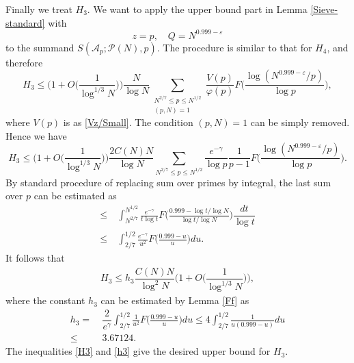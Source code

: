 \documentclass[12pt, a4paper]{amsart}
\def\le{\leqslant}
\theoremstyle{plain}
\theoremstyle{remark}
\numberwithin{equation}{section}
\begin{document}
Finally we treat $H_3$. We want to apply the upper bound part
in Lemma \ref{Sieve-standard} with
\[
z=p,\quad Q=N^{0.999-\varepsilon}
\]
to the summand $S(\mathscr{A}_{p};\mathscr{P}(N), p)$. The procedure is 
similar to that for $H_4$, and therefore 
\begin{equation}
H_3 \le \bigg(1+O\bigg(\dfrac{1}{\log^{1/3}N}\bigg)\bigg) \frac{N}{\log N} \sum_{\substack{N^{2/7} \le p \le N^{1/2} \\ (p, N) = 1}}
\frac{V(p)}{\varphi(p)} F\bigg(\frac{\log (N^{0.999-\varepsilon} / p)}{\log p}\bigg),
\end{equation}
where $V(p)$ is as \eqref{Vz/Small}. The condition $(p,N)=1$ can be simply removed. 
Hence we have
\begin{equation}
H_3 \le \bigg(1+O\bigg(\dfrac{1}{\log^{1/3}N}\bigg)\bigg)\dfrac{2C(N)N}{\log N}
\sum_{N^{2/7} \le p \le N^{1/2}}\frac{e^{-\gamma}}{\log p}
\frac{1}{p-1} F\bigg(\frac{\log (N^{0.999-\varepsilon} / p)}{\log p}\bigg).
\end{equation}
By standard procedure of replacing sum over primes by integral, 
the last sum over $p$ can be estimated as 
\begin{equation*}
\begin{aligned}
\le\ & \int_{N^{2/7}}^{N^{1/2}} \frac{e^{-\gamma}}{t\log  t}F\bigg(\frac{0.999-\log t/\log N}{\log t/\log N}\bigg)\dfrac{dt}{\log t}\\
\le\ & \int_{2/7}^{1/2} \frac{e^{-\gamma}}{u^2}F\bigg(\frac{0.999-u}{u}\bigg)du.
\end{aligned}
\end{equation*}
It follows that 
\begin{equation}\label{H3}
\begin{aligned}
H_3\le h_3\dfrac{C(N)N}{\log^2 N}\bigg(1+O\bigg(\dfrac{1}{\log^{1/3}N}\bigg)\bigg),
\end{aligned}
\end{equation}
where the constant $h_3$ can be estimated by Lemma \ref{Ff} as
\begin{equation}\label{h3}
\begin{aligned}
h_{3}=\ & \dfrac{2}{e^{\gamma}}\int_{2/7}^{1/2} \frac{1}{u^2}F\bigg(\frac{0.999-u}{u}\bigg)du
\le 4\int_{2/7}^{1/2} \frac{1}{u(0.999-u)}du\\
\le\ & 3.67124. 
\end{aligned}
\end{equation}
The inequalities \eqref{H3} and \eqref{h3} give the desired upper bound for $H_3$.	
\end{document}
